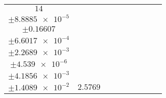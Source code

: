\documentclass[8pt]{article}
\begin{document}
\begin{longtable}[l]{c c c c c c c c c}
$\num{14}$ & \begin{tabular}[c]{@{}c@{}}$\num{3.0706e-2}$ \\ $\pm\num{8.8885e-5}$\end{tabular} & \begin{tabular}[c]{@{}c@{}}$\num{0.19689}$ \\ $\pm\num{0.16607}$\end{tabular} & \begin{tabular}[c]{@{}c@{}}$\num{15.889}$ \\ $\pm\num{6.6017e-4}$\end{tabular} & \begin{tabular}[c]{@{}c@{}}$\num{1.4543e+3}$ \\ $\pm\num{2.2689e-3}$\end{tabular} & \begin{tabular}[c]{@{}c@{}}$\num{2.9094}$ \\ $\pm\num{4.539e-6}$\end{tabular} & \begin{tabular}[c]{@{}c@{}}$\num{1.1877}$ \\ $\pm\num{4.1856e-3}$\end{tabular} & \begin{tabular}[c]{@{}c@{}}$\num{4.2227}$ \\ $\pm\num{1.4089e-2}$\end{tabular} & $\num{2.5769}$\\
\bottomrule
\end{longtable}
\end{document}
